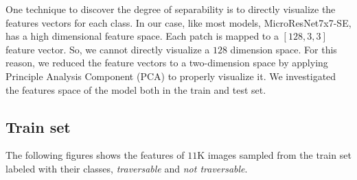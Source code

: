 \documentclass[../document.tex]{subfiles}
\begin{document}
One technique to discover the degree of separability is to directly visualize the features vectors for each class. In our case, like most models, MicroResNet7x7-SE, has a high dimensional feature space. Each patch is mapped to a  $[128, 3, 3 ]$ feature vector. So, we cannot directly visualize a $128$ dimension space. For this reason, we reduced the feature vectors to a two-dimension space by applying Principle Analysis Component (PCA) \cite{pca} to properly visualize it. We investigated the features space of the model both in the train and test set.

\subsection{Train set}
The following figures shows the features of $11$K images sampled from the train set labeled with their classes, \emph{traversable} and \emph{not traversable}. 
\end{document}

